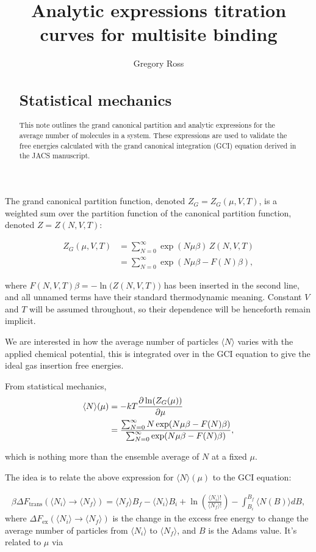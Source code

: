 \documentclass[10pt,a4paper]{article}
\author{Gregory Ross}
\title{Analytic expressions titration curves for multisite binding  }
\begin{document}
\maketitle
\begin{abstract}

\section{Statistical mechanics}
This note outlines the grand canonical partition and analytic expressions for the average number of molecules in a system. These expressions are used to validate the free energies calculated with the grand canonical integration (GCI) equation derived in the JACS manuscript. 
\end{abstract}

The grand canonical partition function, denoted $Z_G = Z_G(\mu,V,T)$, is a weighted sum over the partition function of the canonical partition function, denoted $Z = Z(N,V,T)$:

\begin{align}
Z_G(\mu,V,T) &= \sum_{N=0}^\infty \exp(N\mu\beta) \, Z(N,V,T) \\
&= \sum_{N=0}^\infty \exp(N\mu\beta - F(N)\beta),
\end{align}

where $F(N,V,T)\beta = -\ln\big(Z(N,V,T)\big)$ has been inserted in the second line, and all unnamed terms have their standard thermodynamic meaning. Constant $V$ and $T$ will be assumed throughout, so their dependence will be henceforth remain implicit.

We are interested in how the average number of particles $\langle N \rangle$ varies with the applied chemical potential, this is integrated over in the GCI equation to give the ideal gas insertion free energies.  

From statistical mechanics, 
\begin{align}
\langle N \rangle(\mu) &= -kT\frac{\partial\ln(Z_G(\mu))}{\partial\mu} \notag\\
&= \frac{\sum_{N=0}^\infty N\exp(N\mu\beta - F(N)\beta)}{\sum_{N=0}^\infty \exp(N\mu\beta - F(N)\beta)},
\label{eq:aveN}
\end{align}

which is nothing more than the ensemble average of $N$ at a fixed $\mu$.

The idea is to relate the above expression for $\langle N \rangle(\mu)$ to the GCI equation:

\begin{align}
 \beta \Delta F_\text{trans}( \langle N_i \rangle \rightarrow  \langle N_f \rangle) = \langle N_f \rangle B_f -  \langle N_i\rangle B_i + \ln \left(\frac{\langle N_i \rangle !}{ \langle N_f\rangle !}\right) - \int_{B_i}^{B_f}  \langle N(B) \rangle d B, 
 \label{eq:gci}
\end{align}
where $\Delta F_\text{ex}( \langle N_i \rangle \rightarrow  \langle N_f \rangle)$ is the change in the excess free energy to change the average number of particles from $\langle N_i \rangle$ to  $\langle N_f \rangle$, and $B$ is the Adams value. It's related to $\mu$ via
\end{document}
